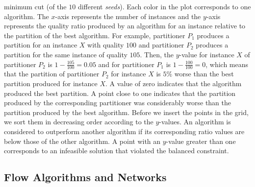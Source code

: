 minimum cut (of the $10$ different \emph{seeds}). Each color in the plot corresponds to
one algorithm. The $x$-axis represents the number of instances and the $y$-axis represents the quality ratio
produced by an algorithm for an instance relative to the partition of the best algorithm. 
For example, partitioner $P_1$ produces a partition for an instance $X$ with
quality $100$ and partitioner $P_2$ produces a partition for the same instance of quality $105$.
Then, the $y$-value for instance $X$ of partitioner $P_2$ is $1 - \frac{105}{100} = 0.05$ and
for partitioner $P_1$ is $1 - \frac{100}{100} = 0$, which means that the partition of partitioner $P_2$
for instance $X$ is $5\%$ worse than the best partition produced for instance $X$.
 A value of zero indicates that the algorithm
produced the best partition. A point close to one indicates that the partition produced by the 
corresponding partitioner was considerably worse than the partition produced by the best
algorithm. Before we insert the points in the grid, we sort them in decreasing order 
according to the $y$-values. An algorithm is considered to outperform another algorithm if its 
corresponding ratio values are below those of the other algorithm. A point with an $y$-value
greater than one corresponds to an infeasible solution that violated the balanced constraint.

\subsection{Flow Algorithms and Networks}
\label{sec:exp_flow_network}

